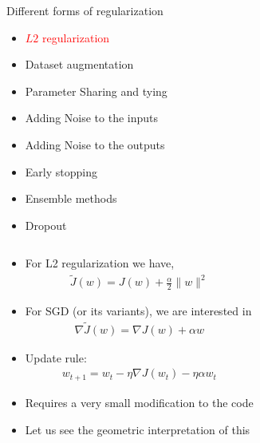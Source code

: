 \begin{frame}
\end{frame}

\begin{frame}
	\vspace{4em}
	\begin{overlayarea}{\textwidth}{\textheight}
		\begin{block}{Different forms of regularization}
			\begin{itemize}
				\item \textcolor{red}{$L2$ regularization}
				\item Dataset augmentation
				\item Parameter Sharing and tying
				\item Adding Noise to the inputs 
				\item Adding Noise to the outputs
				\item Early stopping
				\item Ensemble methods
				\item Dropout
			\end{itemize}
		\end{block}
	\end{overlayarea}
\end{frame}

	
\begin{frame}
	\begin{columns}
		\column{\textwidth}
		\vspace{2em}
		\begin{overlayarea}{\textwidth}{\textheight}
			\begin{itemize}
				\item<1-> For L2 regularization we have,
				\begin{align*} 
					\widetilde{J}(w) = J(w) + \frac{\alpha}{2} \|w\|^2
				\end{align*}
				\item<2-> For SGD (or its variants), we are interested in
				\begin{align*}
					\nabla \widetilde{J}(w) =  \nabla J(w) + \alpha w
				\end{align*}
				\item<3-> Update rule:
				\begin{align*}
				w_{t+1} = w_t - \eta \nabla J(w_t) - \eta \alpha w_t
				\end{align*}
				\item<4-> Requires a very small modification to the code
									
				\item<5-> Let us see the geometric interpretation of this
			\end{itemize}
		\end{overlayarea}
	\end{columns}
\end{frame}
	
